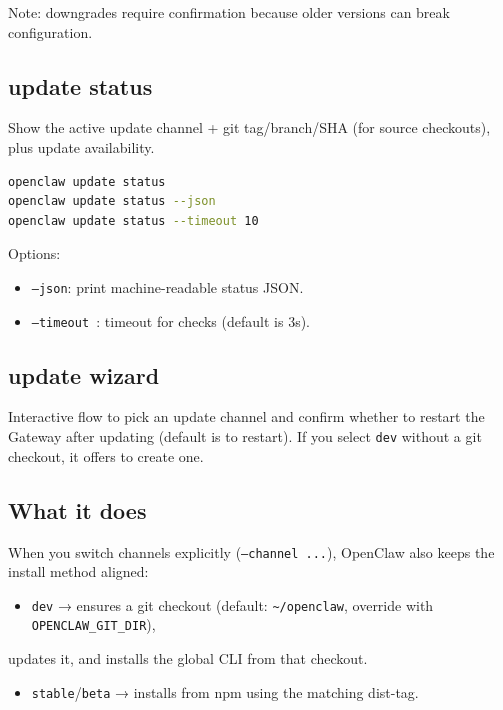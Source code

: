 Note: downgrades require confirmation because older versions can break configuration.

\subsection{update status}


Show the active update channel + git tag/branch/SHA (for source checkouts), plus update availability.

\begin{lstlisting}[language=bash]
openclaw update status
openclaw update status --json
openclaw update status --timeout 10
\end{lstlisting}


Options:

\begin{itemize}
  \item \texttt{--json}: print machine-readable status JSON.
  \item \texttt{--timeout }: timeout for checks (default is 3s).
\end{itemize}


\subsection{update wizard}


Interactive flow to pick an update channel and confirm whether to restart the Gateway
after updating (default is to restart). If you select \texttt{dev} without a git checkout, it
offers to create one.

\subsection{What it does}


When you switch channels explicitly (\texttt{--channel ...}), OpenClaw also keeps the
install method aligned:

\begin{itemize}
  \item \texttt{dev} → ensures a git checkout (default: \texttt{\textasciitilde{}/openclaw}, override with \texttt{OPENCLAW\_GIT\_DIR}),
\end{itemize}

updates it, and installs the global CLI from that checkout.
\begin{itemize}
  \item \texttt{stable}/\texttt{beta} → installs from npm using the matching dist-tag.
\end{itemize}



